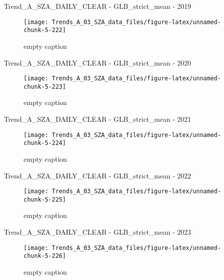\documentclass[
  10pt,
  a4paper,oneside]{article}
\begin{document}
Trend\_A\_SZA\_DAILY\_CLEAR - GLB\_strict\_mean - 2019

\begin{figure}[!ht]

{\centering \texttt{[image: Trends\_A\_03\_SZA\_data\_files/figure-latex/unnamed-chunk-5-222]} 

}

\caption{ empty caption }\label{fig:unnamed-chunk-5-222}
\end{figure}

Trend\_A\_SZA\_DAILY\_CLEAR - GLB\_strict\_mean - 2020

\begin{figure}[!ht]

{\centering \texttt{[image: Trends\_A\_03\_SZA\_data\_files/figure-latex/unnamed-chunk-5-223]} 

}

\caption{ empty caption }\label{fig:unnamed-chunk-5-223}
\end{figure}

Trend\_A\_SZA\_DAILY\_CLEAR - GLB\_strict\_mean - 2021

\begin{figure}[!ht]

{\centering \texttt{[image: Trends\_A\_03\_SZA\_data\_files/figure-latex/unnamed-chunk-5-224]} 

}

\caption{ empty caption }\label{fig:unnamed-chunk-5-224}
\end{figure}

Trend\_A\_SZA\_DAILY\_CLEAR - GLB\_strict\_mean - 2022

\begin{figure}[!ht]

{\centering \texttt{[image: Trends\_A\_03\_SZA\_data\_files/figure-latex/unnamed-chunk-5-225]} 

}

\caption{ empty caption }\label{fig:unnamed-chunk-5-225}
\end{figure}

Trend\_A\_SZA\_DAILY\_CLEAR - GLB\_strict\_mean - 2023

\begin{figure}[!ht]

{\centering \texttt{[image: Trends\_A\_03\_SZA\_data\_files/figure-latex/unnamed-chunk-5-226]} 

}

\caption{ empty caption }\label{fig:unnamed-chunk-5-226}
\end{figure}
\end{document}
